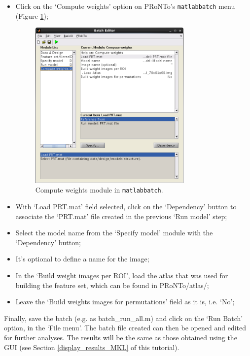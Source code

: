 \begin{itemize}

	\item Click on the `Compute weights' option on PRoNTo's {\tt matlabbatch} menu (Figure \ref{fig:batchWeightsMKL});
	
	\begin{figure}[!h]
	\centering
		\includegraphics[width=0.75\textwidth]{images/Tutorial/mkl/batchWeightsMKL.png}
	\caption{Compute weights module in {\tt matlabbatch}.}
	\label{fig:batchWeightsMKL}
\end{figure}

	\item With `Load PRT.mat' field selected, click on the `Dependency' button to associate the `PRT.mat' file created in the previous `Run model' step;
	
	\item Select the model name from the `Specify model' module with the `Dependency' button;

	\item It's optional to define a name for the image; 

	\item In the `Build weight images per ROI', load the atlas that was used for building the feature set, which can be found in PRoNTo/atlas/;
	
	\item Leave the `Build weights images for permutations' field as it is, i.e. `No'; 
	

\end{itemize}

Finally, save the batch (e.g. as batch\_run\_all.m) and click on the `Run Batch' option, in the `File menu'. The batch file created can then be opened and edited for further analyses. The results will be the same as those obtained using the GUI (see Section \ref{display_results_MKL}  of this tutorial).
